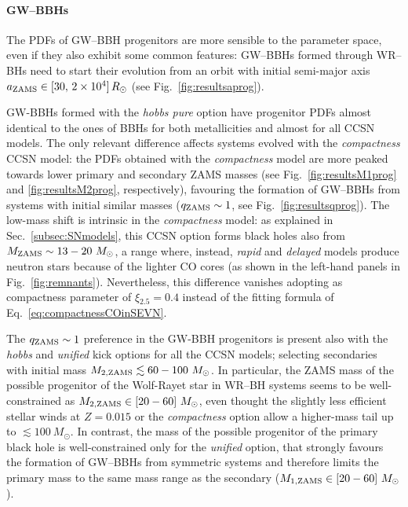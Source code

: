 \documentclass[a4paper,titlepage]{book}     	%
\newcommand{\sun}{\ensuremath{_\odot}}
\newcommand{\mzams}{M_\textup{ZAMS}}
\newcommand{\msun}{\ensuremath{M\sun}}
\newcommand{\rsun}{R_{\odot}}
\newcommand{\micmap}[1]{\textcolor{red}{MM:\bf#1}}
\begin{document}
\paragraph{GW--BBHs} The PDFs of GW--BBH progenitors are more sensible to the parameter space, even if they also exhibit some common features: GW--BBHs formed through WR--BHs need to start their evolution from an orbit with initial semi-major axis $a_{\rm ZAMS} \in[30,\,{}2\times{}10^4]\,{}\rsun$ (see Fig.~\ref{fig:resultsaprog}). 

GW-BBHs formed with the \emph{hobbs pure} option have progenitor PDFs almost identical to the ones of BBHs for both metallicities and almost for all CCSN models. The only relevant difference affects systems evolved with the \emph{compactness} CCSN model: the PDFs obtained with the \emph{compactness} model are more peaked towards lower primary and secondary ZAMS masses (see Fig.\ \ref{fig:resultsM1prog} and \ref{fig:resultsM2prog}, respectively), favouring the formation of GW--BBHs from systems with initial similar masses ($q_{\rm ZAMS} \sim 1$, see Fig.\ \ref{fig:resultsqprog}). The low-mass shift is intrinsic in the \emph{compactness} model: as explained in Sec.\ \ref{subsec:SNmodels}, this CCSN option forms black holes also from $\mzams \sim 13-20~\msun$, a range where, instead, \emph{rapid} and \emph{delayed} models produce neutron stars because of the lighter CO cores (as shown in the left-hand panels in Fig.\ \ref{fig:remnants}). Nevertheless, this difference vanishes adopting as compactness parameter of $\xi{}_{2.5}=0.4$ instead of the fitting formula of Eq.\ \ref{eq:compactnessCOinSEVN}. 

The $q_{\rm ZAMS} \sim 1$ preference in the GW-BBH progenitors is present also with the \emph{hobbs} and \emph{unified} kick options for all the CCSN models; selecting secondaries with initial mass $M_{\rm 2,ZAMS} \lesssim 60-100~\msun$. In particular, the ZAMS mass of the possible progenitor of the Wolf-Rayet star in WR--BH systems seems to be well-constrained as $M_{\rm 2, ZAMS} \in [20-60]~\msun$, even thought the slightly less efficient stellar winds at $Z=0.015$ or the \emph{compactness} option allow a higher-mass tail up to $\lesssim 100~\msun$. In contrast, the mass of the possible progenitor of the primary black hole is well-constrained only for the \emph{unified} option, that strongly favours the formation of GW--BBHs from symmetric systems and therefore limits the primary mass to the same  mass range as the secondary ($M_{\rm 1, ZAMS} \in [20-60]~\msun$).
\end{document}
